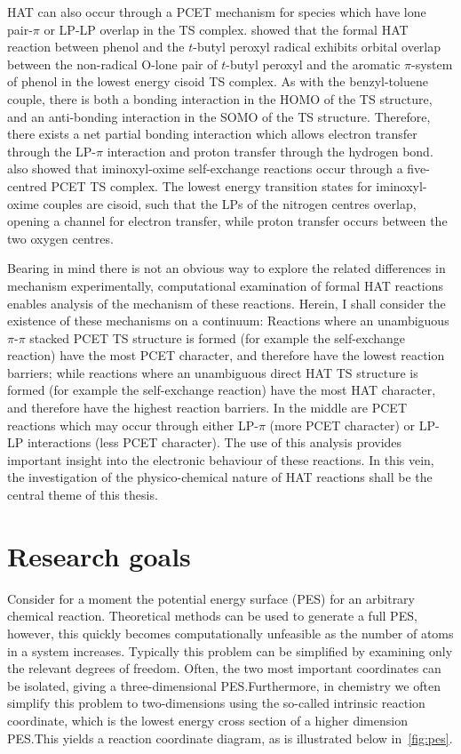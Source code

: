 HAT can also occur through a PCET mechanism for species which have lone
pair-$\pi$ or LP-LP overlap in the TS complex.\cite{DiLabio2007,
DiLabio2005} \citet{DiLabio2007} showed that the formal HAT reaction between
phenol and the $t$-butyl peroxyl radical exhibits orbital overlap between the
non-radical O-lone pair of $t$-butyl peroxyl and the aromatic $\pi$-system of
phenol in the lowest energy cisoid TS complex. As with the benzyl-toluene
couple, there is both a bonding interaction in the HOMO of the TS structure, and
an anti-bonding interaction in the SOMO of the TS structure. Therefore, there
exists a net partial bonding interaction which allows electron transfer through
the LP-$\pi$ interaction and proton transfer through the hydrogen bond.
\citet{DiLabio2005} also showed that iminoxyl-oxime self-exchange reactions
occur through a five-centred PCET TS complex. The lowest energy transition
states for iminoxyl-oxime couples are cisoid, such that the LPs of the
nitrogen centres overlap, opening a channel for electron transfer, while proton
transfer occurs between the two oxygen centres.

Bearing in mind there is not an obvious way to explore the related differences
in mechanism experimentally, computational examination of formal HAT reactions
enables analysis of the mechanism of these reactions. Herein, I shall consider
the existence of these mechanisms on a continuum: Reactions where an unambiguous
$\pi$-$\pi$ stacked PCET TS structure is formed (for example the  self-exchange reaction) have the most PCET character, and therefore have
the lowest reaction barriers; while reactions where an unambiguous direct HAT TS
structure is formed (for example the  self-exchange reaction)
have the most HAT character, and therefore have the highest reaction barriers.
In the middle are PCET reactions which may occur through either LP-$\pi$ (more
PCET character) or LP-LP interactions (less PCET character). The use of this
analysis provides important insight into the electronic behaviour of these
reactions. In this vein, the investigation of the physico-chemical nature of HAT
reactions shall be the central theme of this thesis.

\section{Research goals}

Consider for a moment the potential energy surface (PES) for an arbitrary
chemical reaction. Theoretical methods can be used to generate a full PES,
however, this quickly becomes computationally unfeasible as the number of atoms
in a system increases. Typically this problem can be simplified by examining
only the relevant degrees of freedom. Often, the two most important coordinates
can be isolated, giving a three-dimensional PES.\@ Furthermore, in chemistry we
often simplify this problem to two-dimensions using the so-called intrinsic
reaction coordinate, which is the lowest energy cross section of a higher
dimension PES.\@ This yields a reaction coordinate diagram, as is illustrated
below in~\ref{fig:pes}.


